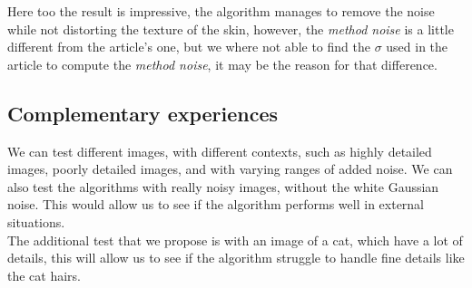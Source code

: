 \documentclass[a4paper, twocolumn, twoside]{article}
\begin{document}
Here too the result is impressive, 
the algorithm manages to remove the noise while not distorting the texture of the skin,
however, the \textit{method noise} is a little different from the article's one,
but we where not able to find the $\sigma$ used in the article to compute the \textit{method noise},
it may be the reason for that difference.
\subsection{Complementary experiences}
We can test different images, with different contexts,
such as highly detailed images, poorly detailed images,
and with varying ranges of added noise. We can also test the algorithms with really noisy images,
without the white Gaussian noise.
This would allow us to see if the algorithm performs well in external situations.\\
The additional test that we propose is with an image of a cat,
which have a lot of details, this will allow us to see if the algorithm struggle to handle fine details like the cat hairs.
\end{document}
